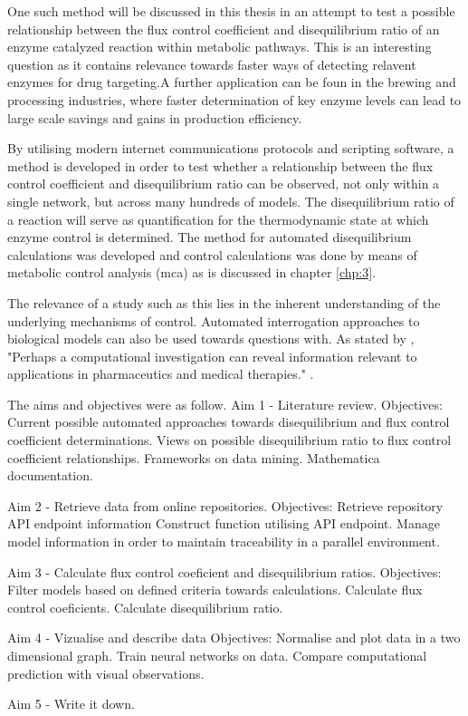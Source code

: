 One such method will be discussed in this thesis in an attempt to test a possible relationship between the flux control coefficient and disequilibrium ratio of an enzyme catalyzed reaction within metabolic pathways. This is an interesting question as it contains relevance towards faster ways of detecting relavent enzymes for drug targeting.A further application can be foun in the brewing and processing industries, where faster determination of key enzyme levels can lead to large scale savings and gains in production efficiency. 

By utilising modern internet communications protocols and scripting software, a method is developed in order to test whether a relationship between the flux control coefficient and disequilibrium ratio can be observed, not only within a single network, but across many hundreds of models. The disequilibrium ratio of a reaction will serve as quantification for the thermodynamic state at which enzyme control is determined. The method for automated disequilibrium calculations was developed and control calculations was done by means of metabolic control analysis (\gls{mca}) as is discussed in chapter \ref{chp:3}. 

The relevance of a study such as this lies in the inherent understanding of the underlying mechanisms of control. Automated interrogation approaches to biological models can also be used towards questions with. As stated by \citeauthor{Knudsen2004}, "Perhaps a computational investigation can reveal information relevant to applications in pharmaceutics and medical therapies." \cite{Knudsen2004}.

The aims and objectives were as follow.
Aim 1 - Literature review.
	Objectives: Current possible automated approaches towards disequilibrium and flux 				control coefficient determinations.
				Views on possible disequilibrium ratio to flux control coefficient relationships.
				Frameworks on data mining.
				Mathematica documentation.

Aim 2 - Retrieve data from online repositories.
	Objectives: Retrieve repository API endpoint information
				Construct function utilising API endpoint.
				Manage model information in order to maintain traceability in a parallel environment.

Aim 3 - Calculate flux control coeficient and disequilibrium ratios.
	Objectives: Filter models based on defined criteria towards calculations.
				Calculate flux control coeficients.
				Calculate disequilibrium ratio.

Aim 4 - Vizualise and describe data
	Objectives: Normalise and plot data in a two dimensional graph.
				Train neural networks on data.
				Compare computational prediction with visual observations.

Aim 5 - Write it down.

 

